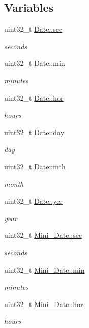\subsection*{Variables}
\begin{DoxyCompactItemize}
\item 
uint32\+\_\+t \mbox{\hyperlink{group__rtc_gad1dd4ea2eac5b95869aecea036e93d93}{Date\+::sec}}
\begin{DoxyCompactList}\small\item\em seconds \end{DoxyCompactList}\item 
uint32\+\_\+t \mbox{\hyperlink{group__rtc_gad11927da04c378087cb0cf44cbf25759}{Date\+::min}}
\begin{DoxyCompactList}\small\item\em minutes \end{DoxyCompactList}\item 
uint32\+\_\+t \mbox{\hyperlink{group__rtc_gaa5ba3c37c4f61fa5ec64580241ecdb4c}{Date\+::hor}}
\begin{DoxyCompactList}\small\item\em hours \end{DoxyCompactList}\item 
uint32\+\_\+t \mbox{\hyperlink{group__rtc_gab435b6ac408b48a2edc5838cdc8aa914}{Date\+::day}}
\begin{DoxyCompactList}\small\item\em day \end{DoxyCompactList}\item 
uint32\+\_\+t \mbox{\hyperlink{group__rtc_ga9441c8119c91c63a623ab4bb3a42e340}{Date\+::mth}}
\begin{DoxyCompactList}\small\item\em month \end{DoxyCompactList}\item 
uint32\+\_\+t \mbox{\hyperlink{group__rtc_ga8bc3e3b0d57e50d6d4c62f76922de55e}{Date\+::yer}}
\begin{DoxyCompactList}\small\item\em year \end{DoxyCompactList}\item 
uint32\+\_\+t \mbox{\hyperlink{group__rtc_gaf04de8c74857b4c272fab97e2c86c6e5}{Mini\+\_\+\+Date\+::sec}}
\begin{DoxyCompactList}\small\item\em seconds \end{DoxyCompactList}\item 
uint32\+\_\+t \mbox{\hyperlink{group__rtc_ga057686fc8ec2afc5a4859109bfee257a}{Mini\+\_\+\+Date\+::min}}
\begin{DoxyCompactList}\small\item\em minutes \end{DoxyCompactList}\item 
uint32\+\_\+t \mbox{\hyperlink{group__rtc_gad8a3e5a41f6368d916d09efb9b99442e}{Mini\+\_\+\+Date\+::hor}}
\begin{DoxyCompactList}\small\item\em hours \end{DoxyCompactList}\end{DoxyCompactItemize}


